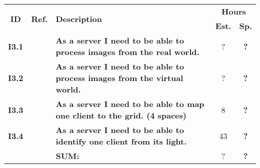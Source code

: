   \label{tab:sprint3stories}
 \def\arraystretch{1.25}
 
\begin{longtable}{ccXcc}

\toprule[0.5mm]
\multirow{2}{*}{\textbf{ID}} &
\multirow{2}{*}{\textbf{Ref.}} & \multirow{2}{*}{\textbf{Description}} & \multicolumn{2}{c}{\textbf{Hours}} \\
 					& & & \textbf{Est.} & \textbf{Sp.} \\
\midrule
\textbf{I3.1} 	& 	& {\bf As a server I need to be able to process images from the real world.}		& ?		& \textbf{?} \\

\textbf{I3.2} 	& 	& {\bf As a server I need to be able to process images from the virtual world.}		& ?		& \textbf{?} \\

\textbf{I3.3} 	& 	& {\bf As a server I need to be able to map one client to the grid. (4 spaces)} 	& 8		& \textbf{?} \\	

\textbf{I3.4} 	& 	& {\bf As a server I need to be able to identify one client from its light.} 		& 43	& \textbf{?} \\
	
\midrule
		
				&& \textbf{SUM:}		&		?	& \textbf{?}
 \\																			
\bottomrule[0.5mm]
\end{longtable}
